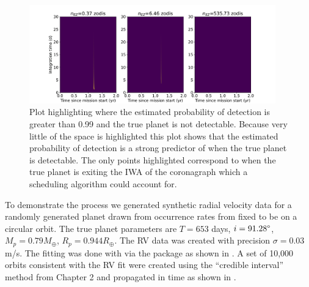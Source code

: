 \begin{figure}
  \begin{center}
    \includegraphics[width=0.95\textwidth]{ch3/figures/pdet_colored_true_err.pdf}
  \end{center}
  \caption{Plot highlighting where the estimated probability of detection is greater
  than 0.99 and the true planet is not detectable. Because very little of the space
  is highlighted this plot shows that the estimated probability of detection is a
  strong predictor of when the true planet is detectable. The only points highlighted
  correspond to when the true planet is exiting the IWA of the coronagraph which a
  scheduling algorithm could account for.}
  \label{fig:pdet_colored_true_err}
\end{figure}


To demonstrate the process we generated synthetic radial velocity data for a
randomly generated planet drawn from occurrence rates from
\citet{dulzJointRadialVelocity2020} fixed to be on a circular orbit. The true
planet parameters are $T=653$ days, $i=91.28\degree$, $M_p=0.79 M_\oplus$, $R_p
= 0.944 R_\oplus$. The RV data was created with precision $\sigma=0.03$ m/s.
The fitting was done with  \citep{fultonRadvelRadialVelocity2018}
via the  package \citep{rosenthalCaliforniaLegacy2021} as shown in . A set of 10,000 orbits consistent with the RV
fit were created using the ``credible interval'' method from Chapter 2 and
propagated in time as shown in .

